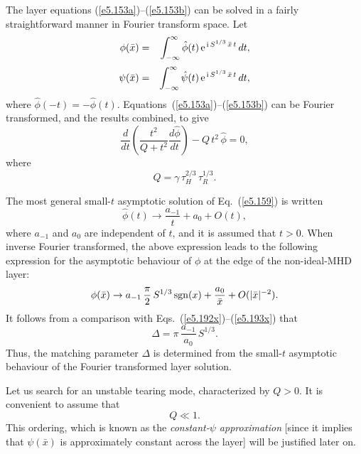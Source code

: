 The layer equations (\ref{e5.153a})--(\ref{e5.153b}) can be solved in a fairly straightforward manner
in Fourier transform space. Let
\begin{eqnarray}\label{e5.158a}
\phi(\bar{x}) &=& \int_{-\infty}^{\infty}
\hat{\phi}(t) \,{\rm e}^{\,{\rm i}\,S^{1/3}\, \bar{x}\,t}\,
dt,\\[0.5ex]
\psi(\bar{x}) &=& \int_{-\infty}^{\infty} \hat{\psi}(t)\, 
{\rm e}^{\,{\rm i}\,S^{1/3}\,\bar{x}\,t}\,dt,\label{e5.158b}
\end{eqnarray}
where $\hat{\phi}(-t)=-\hat{\phi}(t)$.
Equations~(\ref{e5.153a})--(\ref{e5.153b}) can be Fourier transformed, and the results combined, to
give
\begin{equation}\label{e5.159}
\frac{d}{dt}\!\left(\frac{t^2}{Q+t^2}\frac{d\hat{\phi}}{dt}\right)
-Q\,t^2\,\hat{\phi} = 0,
\end{equation}
where
\begin{equation}
Q = \gamma\,\tau_H^{2/3}\,\tau_R^{1/3}.
\end{equation}

The most general small-$t$ asymptotic solution of Eq.~(\ref{e5.159}) is written
\begin{equation}\label{e5.161}
\hat{\phi}(t) \rightarrow \frac{a_{-1}}{t} + a_0 + O(t),
\end{equation}
where $a_{-1}$ and $a_0$ are independent of $t$, and it is assumed that $t>0$. 
When inverse Fourier transformed, the above expression leads to the
following expression for the asymptotic behaviour of
$\phi$ at the edge of
the non-ideal-MHD layer:
\begin{equation}
\phi(\bar{x})\rightarrow a_{-1}\,\frac{\pi}{2}\,S^{1/3}\,{\rm sgn}(x) + \frac{a_0}{\bar{x}}
+O(|\bar{x}|^{-2}).
\end{equation}
It follows from a comparison with Eqs.~(\ref{e5.192x})--(\ref{e5.193x}) that
\begin{equation}\label{e5.163}
{\Delta} = \pi\,\frac{a_{-1}}{a_0}\,S^{1/3}.
\end{equation}
Thus, the matching parameter ${\Delta}$ is determined from  the
small-$t$ asymptotic behaviour of the Fourier transformed layer solution.

Let us search for an unstable tearing mode, characterized by $Q>0$. It is
convenient to assume that
\begin{equation}\label{e5.164}
Q\ll 1.
\end{equation}
This ordering, which is known as the {\em constant-$\psi$ approximation} [since
it implies that $\psi(\bar{x})$ is approximately constant across the layer]
will be justified later on. 


